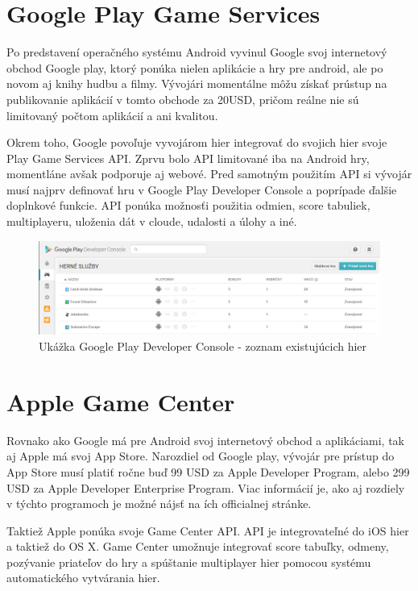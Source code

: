 \section{Google Play Game Services}
Po predstavení operačného systému Android vyvinul Google svoj internetový obchod Google play, ktorý ponúka nielen aplikácie a hry pre android, ale po novom aj knihy hudbu a filmy. Vývojári momentálne môžu získať prústup na publikovanie aplikácií  v tomto obchode za 20USD, pričom reálne nie sú limitovaný počtom aplikácií a ani kvalitou.  

Okrem toho, Google povoľuje vyvojárom hier integrovať do svojich hier svoje Play Game Services API. Zprvu bolo API limitované iba na Android hry, momentláne avšak podporuje aj webové. Pred samotným použitím API si vývojár musí najprv definovať hru v Google Play Developer Console a poprípade ďalšie doplnkové funkcie. API ponúka možnosťi použitia odmien, score tabuliek, multiplayeru, uloženia dát v cloude, udalosti a úlohy a iné. 
\begin{figure}[h]
  \centering
  \includegraphics[scale=0.32]{fig/google-play.png}
  \caption{Ukážka Google Play Developer Console  - zoznam existujúcich hier}
  \label{fig:google-play}
\end{figure}

\section{Apple Game Center}
Rovnako ako Google má pre Android svoj internetový obchod a aplikáciami, tak aj Apple má svoj App Store. Narozdiel od Google play, vývojár pre prístup do App Store musí platiť ročne buď 99 USD za Apple Developer Program, alebo 299 USD za Apple Developer Enterprise Program. Viac informácií je, ako aj rozdiely v týchto programoch je možné nájsť na ích officialnej stránke. 

Taktiež Apple ponúka svoje Game Center API. API je integrovateľné do iOS hier a taktiež do OS X. Game Center umožnuje integrovať score tabuľky, odmeny, pozývanie priateľov do hry a spúštanie multiplayer hier pomocou systému automatického vytvárania hier.

